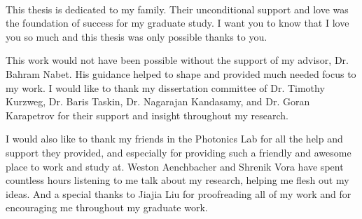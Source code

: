 \begin{preamble}

\iffinal{}{\newpage}

\begin{DUTdedications}
%
\vspace*{\fill}
%
\begin{center}
\begin{minipage}{8 cm}
\begin{center}
\hrulefill\\
This thesis is dedicated to my family. Their unconditional support and love was the foundation of success for my graduate study. I want you to know that I love you so much and this thesis was only possible thanks to you. 
\hrulefill
\vspace{6em}
\end{center}
\end{minipage}
\end{center}
\vspace*{\fill}
\end{DUTdedications}

\iffinal{}{\newpage}

\begin{acknowledgments}
This work would not have been possible without the support of my advisor, Dr.
Bahram Nabet. His guidance helped to shape and provided much needed focus to my
work.  I would like to thank my dissertation committee of Dr. Timothy Kurzweg,
Dr. Baris Taskin, Dr. Nagarajan Kandasamy, and Dr. Goran Karapetrov for their
support and insight throughout my research.

I would also like to thank my friends in the Photonics Lab for all the help and
support they provided, and especially for providing such a friendly and
awesome place to work and study at. Weston Aenchbacher and Shrenik Vora have spent countless hours listening to me talk about
my research, helping me flesh out my ideas. And a special thanks to Jiajia Liu
for proofreading all of my work and for encouraging me throughout my graduate
work.  

\end{acknowledgments}

\iffinal{}{\newpage}

\tableofcontents 
\iffinal{}{\newpage}

\listoftables
\iffinal{}{\newpage}

\listoffigures 
\iffinal{}{\newpage}


\end{preamble}
